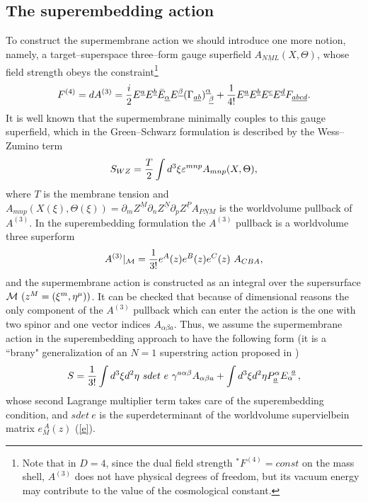 \documentclass[a4paper,12pt]{article}
\begin{document}
\subsection{The superembedding action}
To construct the supermembrane action we should introduce one
more notion, namely, a target--superspace three--form gauge
superfield $A_{\underline{NML}}(X,\Theta)$, whose field strength
obeys the constraint\footnote{Note that in $D=4$, since the dual
field strength
${}^*F^{(4)}=const$ on the mass shell, $A^{(3)}$ does not have physical
degrees of freedom, but its vacuum energy may contribute to the
value of the cosmological constant.}
\begin{equation}\label{7}
F^{(4)}=dA^{(3)}={i\over 2}E^{\underline a}E^{\underline b}\bar
E_{\underline\alpha}E^{\underline\beta} (\Gamma_{\underline a
\underline b})^{\underline
\alpha}_
{~\underline\beta} +{1\over{4!}}E^{\underline a}E^{\underline b}
E^{\underline c}E^{\underline d} F_{\underline a\underline
b\underline c\underline d}.
\end{equation}
It is well known that the supermembrane minimally couples to this
gauge superfield, which in the Green--Schwarz formulation
\cite{bst1} is described by the Wess--Zumino term
\begin{equation}\label{wz}
S_{WZ}={T\over 2}\int d^3\xi \varepsilon^{mnp}A_{mnp}(X,\Theta),
\end{equation}
where $T$ is the membrane tension and
$A_{mnp}\left(X(\xi),\Theta(\xi)\right)=\partial_mZ^{\underline M}
\partial_nZ^{\underline N}\partial_pZ^{\underline P}A_{\underline{PNM}}$
is the worldvolume pullback of
$A^{(3)}$. In the superembedding formulation the $A^{(3)}$
pullback is a worldvolume three superform
\begin{equation}\label{a3pull}
A^{(3)}|_{\cal M}={1\over{3!}}e^A(z)e^B(z)e^C(z)~A_{CBA},
\end{equation}
and the supermembrane action is constructed as an integral over
the supersurface ${\cal M}~ (z^M=(\xi^m,\eta^\mu))$. It can be
checked that because of dimensional reasons the only component of
the $A^{(3)}$ pullback which can enter the action is the one with
two spinor and one vector indices $A_{\alpha\beta a}$. Thus, we
assume the supermembrane action in the superembedding approach to
have the following form \cite{pst} (it is a ``brany"
generalization of an $N=1$ superstring action proposed in
\cite{tonin})
\begin{equation}\label{a2}
S={1\over{3!}}\int d^3\xi
d^2\eta~sdet{~e}~\gamma^{a\alpha\beta}A_{\alpha\beta a}+
\int d^3\xi d^2\eta P^\alpha_{\underline a}E^{~\underline
a}_{\alpha} \,,
\end{equation}
whose second Lagrange multiplier term takes care of the
superembedding condition, and $sdet{~e}$ is the superdeterminant
of the worldvolume supervielbein matrix $e^{~A}_M(z)$ (\ref{e}).
\end{document}
